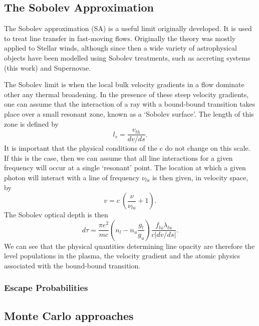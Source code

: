 \subsection{The Sobolev Approximation}

The Sobolev approximation (SA) is a useful limit originally developed.
It is used to treat line transfer in fast-moving flows. Originally 
the theory was mostly applied to Stellar winds, although since then
a wide variety of astrophysical objects have been modelled using Sobolev treatments,
such as accreting systems (this work) and Supernovae.

The Sobolev limit is when the local bulk velocity gradients in a flow 
dominate other any thermal broadening. In the presence of these steep
velocity gradients, one can assume that the interaction of a ray with a bound-bound
transition takes place over a small resonant zone, known as a 
`Sobolev surface'. The length of this zone is defined by
\begin{equation}
l_s = \frac{v_{th}}{dv / ds}.
\end{equation}
It is important that the physical conditions of the c do not change on this scale.
If this is the case, then we can assume that all line interactions for a given 
frequency will occur at a single `resonant' point. The location at which
a given photon will interact with a line of frequency $\nu_{lu}$
is then given, in velocity space, by
\begin{equation}
v = c~\left(\frac{\nu}{\nu_{lu}} + 1\right).
\label{eq:resonance}
\end{equation}
The Sobolev optical depth is then
\begin{equation}
d \tau = \frac{\pi e^2}{m c}  \left(n_l - n_u \frac{g_l}{g_u} \right) \frac{f_{lu} \lambda_{lu}}{c | dv / ds |}.
\label{eq:tau_sob}
\end{equation}
We can see that the physical quantities determining line opacity are therefore 
the level populations in the plasma, the velocity gradient and the atomic physics
associated with the bound-bound transition.

\subsubsection{Escape Probabilities}





\subsection{Monte Carlo approaches}

